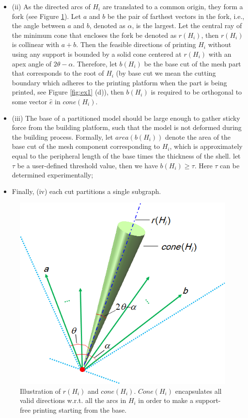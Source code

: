 \begin{itemize}
\item (ii) As the directed arcs of $H_i$ are translated to a common origin, they form a fork (see Figure \ref{fig:cone}). Let $a$ and $b$ be the pair of farthest vectors in the fork, i.e., the angle between $a$ and $b$, denoted as $\alpha$, is the largest. Let the central ray of the minimum cone that encloses the fork be denoted as $r(H_i)$, then $r(H_i)$ is collinear with $a + b$. Then the feasible directions of printing $H_i$ without using any support is bounded by a solid cone centered at $r(H_i)$ with an apex angle of $2\theta-\alpha$. Therefore, let $b(H_i)$ be the base cut of the mesh part that corresponds to the root of $H_i$ (by base cut we mean the cutting boundary which adheres to the printing platform when the part is being printed, see Figure \ref{fig:ex1} (d)), then $b(H_i)$ is required to be orthogonal to some vector $\hat{e}$ in $cone(H_i)$.
\item (iii) The base of a partitioned model should be large enough to gather sticky force from the building platform, such that the model is not deformed during the building process. Formally, let $area(b(H_i))$ denote the area of the base cut of the mesh component corresponding to $H_i$, which is approximately equal to the peripheral length of the base times the thickness of the shell. let $\tau$ be a user-defined threshold value, then we have $b(H_i) \geq \tau$. Here $\tau$ can be determined experimentally;

\item Finally, (iv) each cut partitions a single subgraph.

\end{itemize}

\begin{figure}[t]
  \centering
  \includegraphics[width=0.7\linewidth]{figs/cone.png}
  \caption{\label{fig:cone}%
           Illustration of $r(H_i)$ and $cone(H_i)$. $Cone(H_i)$ encapsulates all valid directions w.r.t. all the arcs in $H_i$ in order to make a support-free printing starting from the base.}
\end{figure}


